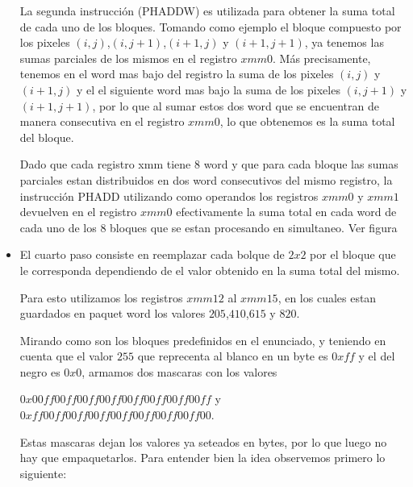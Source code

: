 \begin{itemize}


	La segunda instrucción (PHADDW) es utilizada para obtener la suma total de cada uno de los bloques. Tomando como ejemplo el bloque compuesto por los pixeles $(i,j)$,$(i,j+1)$,$(i+1,j)$ y $(i+1,j+1)$, ya tenemos las sumas parciales de los mismos en el registro $xmm0$. Más precisamente, tenemos en el word mas bajo del registro la suma de los pixeles $(i,j)$ y $(i+1,j)$ y el el siguiente word mas bajo la suma de los pixeles $(i,j+1)$ y $(i+1,j+1)$, por lo que al sumar estos dos word que se encuentran de manera consecutiva en el registro $xmm0$, lo que obtenemos es la suma total del bloque. 

	Dado que cada registro xmm tiene $8$ word y que para cada bloque las sumas parciales estan distribuidos en dos word consecutivos del mismo registro, la instrucción PHADD utilizando como operandos los registros $xmm0$ y $xmm1$ devuelven en el registro $xmm0$ efectivamente la suma total en cada word de cada uno de los $8$ bloques que se estan procesando en simultaneo. Ver figura %


	\item El cuarto paso consiste en reemplazar cada bolque de $2x2$ por el bloque que le corresponda dependiendo de el valor obtenido en la suma total del mismo.

	Para esto utilizamos los registros $xmm12$ al $xmm15$, en los cuales estan guardados en paquet word los valores $205$,$410$,$615$ y $820$.

	Mirando como son los bloques predefinidos en el enunciado, y teniendo en cuenta que el valor $255$ que reprecenta al blanco en un byte es $0xff$ y el del negro es $0x0$, armamos dos mascaras con los valores

	$0x00ff00ff00ff00ff00ff00ff00ff00ff$ y $0xff00ff00ff00ff00ff00ff00ff00ff00$. 

	Estas mascaras dejan los valores ya seteados en bytes, por lo que luego no hay que empaquetarlos.
	Para entender bien la idea observemos primero lo siguiente:


\end{itemize}
